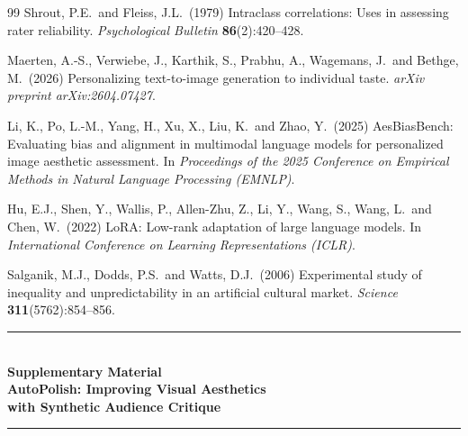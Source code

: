 \documentclass{article}
\begin{document}
\begin{thebibliography}{99}
Shrout, P.E.\ and Fleiss, J.L.\ (1979)
Intraclass correlations: Uses in assessing rater reliability.
{\it Psychological Bulletin} {\bf 86}(2):420--428.

Maerten, A.-S., Verwiebe, J., Karthik, S., Prabhu, A., Wagemans, J.\ and Bethge, M.\ (2026)
Personalizing text-to-image generation to individual taste.
{\it arXiv preprint arXiv:2604.07427}.

Li, K., Po, L.-M., Yang, H., Xu, X., Liu, K.\ and Zhao, Y.\ (2025)
AesBiasBench: Evaluating bias and alignment in multimodal language models for personalized
image aesthetic assessment.
In {\it Proceedings of the 2025 Conference on Empirical Methods in Natural Language
Processing (EMNLP)}.

Hu, E.J., Shen, Y., Wallis, P., Allen-Zhu, Z., Li, Y., Wang, S., Wang, L.\ and Chen, W.\ (2022)
LoRA: Low-rank adaptation of large language models.
In {\it International Conference on Learning Representations (ICLR)}.

Salganik, M.J., Dodds, P.S.\ and Watts, D.J.\ (2006)
Experimental study of inequality and unpredictability in an artificial cultural market.
{\it Science} {\bf 311}(5762):854--856.

\end{thebibliography}
\endgroup


\ifdefined\mainonly\else
\newpage
\begin{center}
  \rule{\textwidth}{4pt}\\[0.16in]
  {\bfseries\fontsize{14}{17}\selectfont Supplementary Material\\[5pt]}
  {\bfseries\fontsize{17}{21}\selectfont AutoPolish: Improving Visual Aesthetics\\ with Synthetic Audience Critique\\[0.14in]}
  \rule{\textwidth}{1pt}
\end{center}
\vspace{1.1em}

\appendix
\setcounter{section}{0}
\renewcommand{\thesection}{S\arabic{section}}
\setcounter{figure}{0}
\renewcommand{\thefigure}{S\arabic{figure}}
\setcounter{table}{0}
\renewcommand{\thetable}{S\arabic{table}}
\end{document}
